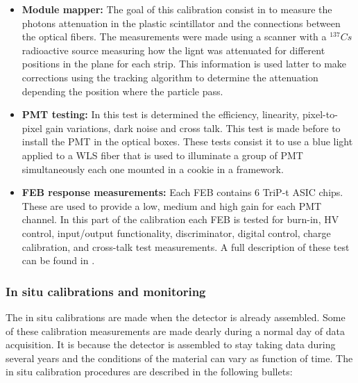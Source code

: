 \begin{itemize}
    \item \textbf{Module mapper:} The goal of this calibration consist in to measure the photons attenuation in the plastic scintillator and the connections between the optical fibers. The measurements were made using a scanner with a $^{137}Cs$ radioactive source measuring how the lignt was attenuated for different positions in the plane for each strip. This information is used latter to make corrections using the tracking algorithm to determine the attenuation depending the position where the particle pass.
    \item \textbf{PMT testing:} In this test is determined the efficiency, linearity, pixel-to-pixel gain variations, dark noise and cross talk. This test is made before to install the PMT in the optical boxes. These tests consist it to use a blue light applied to a WLS fiber that is used to illuminate a group of PMT simultaneously each one mounted in a cookie in a framework.
    \item \textbf{FEB response measurements:} Each FEB contains 6 TriP-t ASIC chips. These are used to provide a low, medium and high gain for each PMT channel. In this part of the calibration each FEB is tested for burn-in, HV control, input/output functionality, discriminator, digital control, charge calibration, and cross-talk test measurements. A full description of these test can be found in \cite{MINERvA}.    
\end{itemize}


\subsubsection{In situ calibrations and monitoring}
\label{Cap:MnvExp:MnvDetector:Calibration:InSitu}

The in situ calibrations are made when the detector is already assembled. Some of these calibration measurements are made dearly during a normal day of data acquisition. It is because the detector is assembled to stay taking data during several years and the conditions of the material can vary as function of time. The in situ calibration procedures are described in the following bullets:

